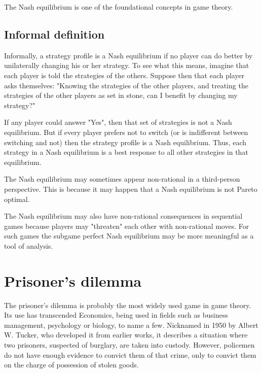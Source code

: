 \documentclass[]{report}
\begin{document}
The Nash equilibrium is one of the foundational concepts in game theory.



\subsection{Informal definition}
Informally, a strategy profile is a Nash equilibrium if no player can do better by unilaterally changing his or her strategy. To see what this means, imagine that each player is told the strategies of the others. Suppose then that each player asks themselves: "Knowing the strategies of the other players, and treating the strategies of the other players as set in stone, can I benefit by changing my strategy?"

If any player could answer "Yes", then that set of strategies is not a Nash equilibrium. But if every player prefers not to switch (or is indifferent between switching and not) then the strategy profile is a Nash equilibrium. Thus, each strategy in a Nash equilibrium is a best response to all other strategies in that equilibrium.

The Nash equilibrium may sometimes appear non-rational in a third-person perspective. This is because it may happen that a Nash equilibrium is not Pareto optimal.

The Nash equilibrium may also have non-rational consequences in sequential games because players may "threaten" each other with non-rational moves. For such games the subgame perfect Nash equilibrium may be more meaningful as a tool of analysis.




\newpage



\section{Prisoner’s dilemma}

The prisoner’s dilemma is probably the most widely used game in game theory. Its use has transcended Economics, being used in fields such as business management, psychology or biology, to name a few. Nicknamed in 1950 by Albert W. Tucker, who developed it from earlier works, it describes a situation where two prisoners, suspected of burglary, are taken into custody. However, policemen do not have enough evidence to convict them of that crime, only to convict them on the charge of possession of stolen goods.
\end{document}
